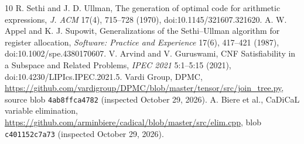 \documentclass[11pt]{article}
\begin{document}
\begin{thebibliography}{10}
 R. Sethi and J. D. Ullman, The generation of optimal code for arithmetic expressions, \emph{J. ACM} 17(4), 715--728 (1970), doi:10.1145/321607.321620.
 A. W. Appel and K. J. Supowit, Generalizations of the Sethi--Ullman algorithm for register allocation, \emph{Software: Practice and Experience} 17(6), 417--421 (1987), doi:10.1002/spe.4380170607.
 V. Arvind and V. Guruswami, CNF Satisfiability in a Subspace and Related Problems, \emph{IPEC 2021} 5:1--5:15 (2021), doi:10.4230/LIPIcs.IPEC.2021.5.
 Vardi Group, DPMC, \url{https://github.com/vardigroup/DPMC/blob/master/tensor/src/join_tree.py}, source blob \texttt{4ab8ffca4782} (inspected October 29, 2026).
 A. Biere et al., CaDiCaL variable elimination, \url{https://github.com/arminbiere/cadical/blob/master/src/elim.cpp}, blob \texttt{c401152c7a73} (inspected October 29, 2026).
\end{thebibliography}
\end{document}
